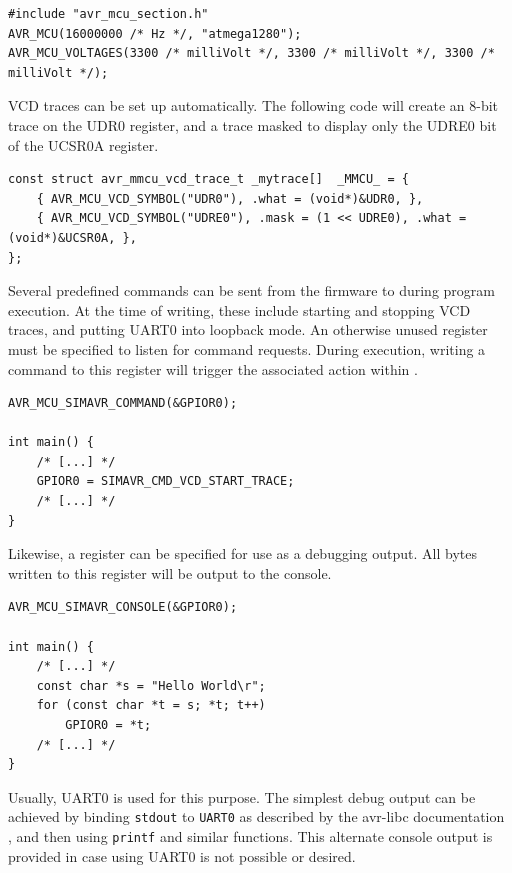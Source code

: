\begin{lstlisting}
#include "avr_mcu_section.h"
AVR_MCU(16000000 /* Hz */, "atmega1280");
AVR_MCU_VOLTAGES(3300 /* milliVolt */, 3300 /* milliVolt */, 3300 /* milliVolt */);
\end{lstlisting}

\ac{VCD} traces can be set up automatically. The following code will create an 8-bit
trace on the UDR0 register, and a trace masked to display only the UDRE0 bit of
the UCSR0A register.

\begin{lstlisting}
const struct avr_mmcu_vcd_trace_t _mytrace[]  _MMCU_ = {
    { AVR_MCU_VCD_SYMBOL("UDR0"), .what = (void*)&UDR0, },
    { AVR_MCU_VCD_SYMBOL("UDRE0"), .mask = (1 << UDRE0), .what = (void*)&UCSR0A, },
};
\end{lstlisting}

Several predefined commands can be sent from the firmware to \simavr during program execution.
At the time of writing, these include starting and stopping \ac{VCD} traces, and putting
UART0 into loopback mode. An otherwise unused register must be specified
to listen for command requests. During execution, writing a command to this
register will trigger the associated action within \simavr.

\begin{lstlisting}
AVR_MCU_SIMAVR_COMMAND(&GPIOR0);

int main() {
    /* [...] */
    GPIOR0 = SIMAVR_CMD_VCD_START_TRACE;
    /* [...] */
}
\end{lstlisting}

Likewise, a register can be specified for use as a debugging output. All bytes
written to this register will be output to the console.

\begin{lstlisting}
AVR_MCU_SIMAVR_CONSOLE(&GPIOR0);

int main() {
    /* [...] */
    const char *s = "Hello World\r";
    for (const char *t = s; *t; t++)
        GPIOR0 = *t;
    /* [...] */
}
\end{lstlisting}

Usually, UART0 is used for this purpose. The simplest debug output can be achieved
by binding \lstinline|stdout| to \lstinline|UART0| as described by the avr-libc
documentation \cite{libc}, and then using \lstinline|printf| and similar functions.
This alternate console output is provided in case using UART0 is not possible or desired.



